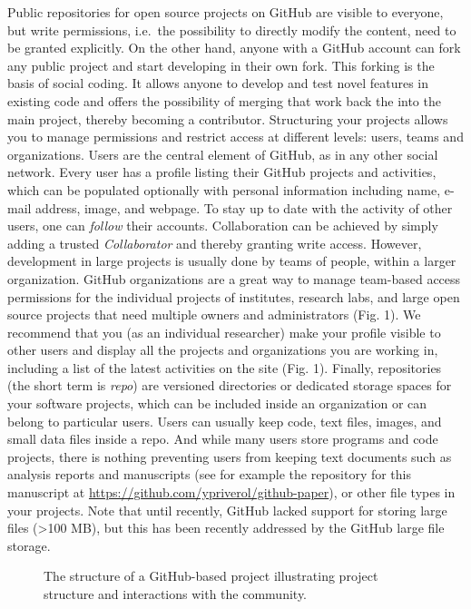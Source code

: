 \documentclass[10pt,letterpaper]{article}
\begin{document}
Public repositories for open source projects on GitHub are visible to everyone, but write
permissions, i.e.~the possibility to directly modify the content, need
to be granted explicitly. On the other hand, anyone with a GitHub
account can fork any public project and start developing in their own
fork. This forking is the basis of social coding. It allows anyone to
develop and test novel features in existing code and offers the
possibility of merging that work back the into the main project,
thereby becoming a contributor. Structuring your projects allows you to
manage permissions and restrict access at different levels: users, teams
and organizations. Users are the central element of GitHub, as in any other
social network. Every user has a profile listing their GitHub projects
and activities, which can be populated optionally with personal
information including name, e-mail address, image, and webpage. To stay
up to date with the activity of other users, one can \emph{follow} their
accounts. Collaboration can be achieved by simply adding a trusted
\emph{Collaborator} and thereby granting write access. However,
development in large projects is usually done by teams of people, within
a larger organization. GitHub organizations are a great way to manage
team-based access permissions for the individual projects of institutes,
research labs, and large open source projects that need multiple owners
and administrators (Fig. 1). We recommend that you (as an individual
researcher) make your profile visible to other users and display all the
projects and organizations you are working in, including a list of the
latest activities on the site (Fig. 1). Finally, repositories (the
short term is \emph{repo}) are versioned directories or dedicated
storage spaces for your software projects, which can be included inside
an organization or can belong to particular users. Users can usually
keep code, text files, images, and small data files inside a repo. And
while many users store programs and code projects, there is nothing
preventing users from keeping text documents such as analysis reports
and manuscripts (see for example the repository for this manuscript at
\url{https://github.com/ypriverol/github-paper}), or other file types in your
projects. Note that until recently, GitHub lacked support for
storing large files (\textgreater{}100 MB), but this has been
recently addressed by the GitHub large file storage.

\begin{figure}[htbp]
\centering
\caption{The structure of a GitHub-based project illustrating project
structure and interactions with the community.}
\end{figure}
\end{document}
